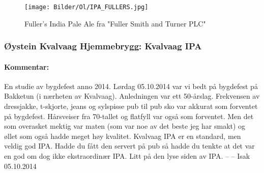 \documentclass[12pt,a4paper,oneside,norsk]{article}
\begin{document}
\begin{figure} [H]
\centering
\texttt{[image: Bilder/Ol/IPA\_FULLERS.jpg]}
\caption{Fuller's India Pale Ale fra "Fuller Smith and Turner PLC"}
\end{figure}

\newpage
\subsubsection{Øystein Kvalvaag Hjemmebrygg: Kvalvaag IPA}
\paragraph{Kommentar:} En studie av bygdefest anno 2014. Lørdag 05.10.2014 var vi bedt på bygdefest på Bakketun (i nærheten av Kvalvaag). Anledningen var ett 50-årslag. Frekvensen av dressjakke, t-skjorte, jeans og sylspisse pub til pub sko var akkurat som forventet på bygdefest. Hårsveiser fra 70-tallet og flatfyll var også som forventet. Men det som overasket mektig var maten (som var noe av det beste jeg har smakt) og øllet som også hadde meget høy kvalitet. Kvalvaag IPA er en standard, men veldig god IPA. Hadde du fått den servert på pub så hadde du tenkte at det var en god om dog ikke ekstraordinær IPA. Litt på den lyse siden av IPA.
-- -- Isak 05.10.2014
\end{document}
